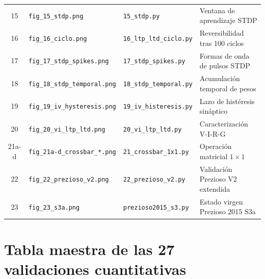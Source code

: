 \begin{table}[H]
\begin{tabular}{c l l p{5.5cm}}
15 & \texttt{fig\_15\_stdp.png} & \texttt{15\_stdp.py} & Ventana de aprendizaje STDP \\
16 & \texttt{fig\_16\_ciclo.png} & \texttt{16\_ltp\_ltd\_ciclo.py} & Reversibilidad tras 100 ciclos \\
17 & \texttt{fig\_17\_stdp\_spikes.png} & \texttt{17\_stdp\_spikes.py} & Formas de onda de pulsos STDP \\
18 & \texttt{fig\_18\_stdp\_temporal.png} & \texttt{18\_stdp\_temporal.py} & Acumulación temporal de pesos \\
19 & \texttt{fig\_19\_iv\_hysteresis.png} & \texttt{19\_iv\_histeresis.py} & Lazo de histéresis sináptico \\
20 & \texttt{fig\_20\_vi\_ltp\_ltd.png} & \texttt{20\_vi\_ltp\_ltd.py} & Caracterización V-I-R-G \\
21a-d & \texttt{fig\_21a-d\_crossbar\_*.png} & \texttt{21\_crossbar\_1x1.py} & Operación matricial $1 \times 1$ \\
22 & \texttt{fig\_22\_prezioso\_v2.png} & \texttt{22\_prezioso\_v2.py} & Validación Prezioso V2 extendida \\
23 & \texttt{fig\_23\_s3a.png} & \texttt{prezioso2015\_s3.py} & Estado virgen Prezioso 2015 S3a \\
\bottomrule
\end{tabular}
\end{table}

\section{Tabla maestra de las 27 validaciones cuantitativas}
\label{sec:tabla_27_validaciones}

